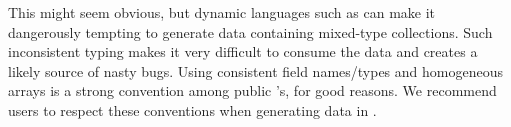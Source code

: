  This might seem obvious, but dynamic languages such as \R can make it dangerously tempting to generate data containing mixed-type collections. Such inconsistent typing makes it very difficult to consume the data and creates a likely source of nasty bugs. Using consistent field names/types and homogeneous \JSON arrays is a strong convention among public \JSON \API's, for good reasons. We recommend \R users to respect these conventions when generating \JSON data in \R.
